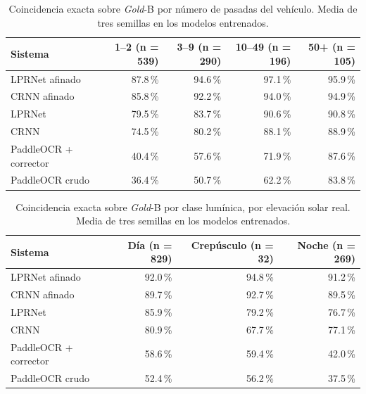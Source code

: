 \begin{table}[H]
\caption{Coincidencia exacta sobre \emph{Gold}-B por número de pasadas del vehículo. Media de tres semillas
en los modelos entrenados.\label{tab:frecuencia}}
\begin{tabularx}{\textwidth}{Xrrrr}
\toprule
\textbf{Sistema} & \textbf{1--2} (n = 539) & \textbf{3--9} (n = 290) & \textbf{10--49} (n = 196) & \textbf{50+} (n = 105) \\
\midrule
LPRNet afinado & 87.8\,\% & 94.6\,\% & 97.1\,\% & 95.9\,\% \\
CRNN afinado & 85.8\,\% & 92.2\,\% & 94.0\,\% & 94.9\,\% \\
LPRNet & 79.5\,\% & 83.7\,\% & 90.6\,\% & 90.8\,\% \\
CRNN & 74.5\,\% & 80.2\,\% & 88.1\,\% & 88.9\,\% \\
PaddleOCR + corrector & 40.4\,\% & 57.6\,\% & 71.9\,\% & 87.6\,\% \\
PaddleOCR crudo & 36.4\,\% & 50.7\,\% & 62.2\,\% & 83.8\,\% \\
\bottomrule
\end{tabularx}
\end{table}

\begin{table}[H]
\caption{Coincidencia exacta sobre \emph{Gold}-B por clase lumínica, por elevación solar real. Media de tres semillas
en los modelos entrenados.\label{tab:luz}}
\begin{tabularx}{\textwidth}{Xrrr}
\toprule
\textbf{Sistema} & \textbf{Día} (n = 829) & \textbf{Crepúsculo} (n = 32) & \textbf{Noche} (n = 269) \\
\midrule
LPRNet afinado & 92.0\,\% & 94.8\,\% & 91.2\,\% \\
CRNN afinado & 89.7\,\% & 92.7\,\% & 89.5\,\% \\
LPRNet & 85.9\,\% & 79.2\,\% & 76.7\,\% \\
CRNN & 80.9\,\% & 67.7\,\% & 77.1\,\% \\
PaddleOCR + corrector & 58.6\,\% & 59.4\,\% & 42.0\,\% \\
PaddleOCR crudo & 52.4\,\% & 56.2\,\% & 37.5\,\% \\
\bottomrule
\end{tabularx}
\end{table}
